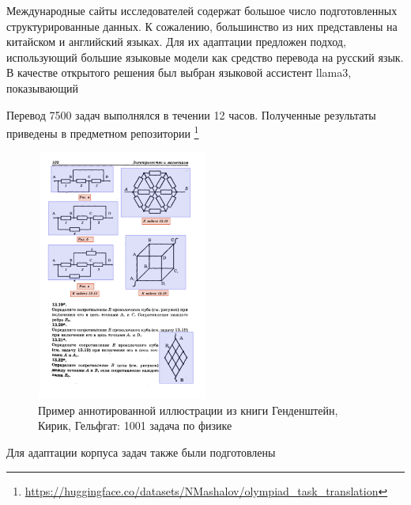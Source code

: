 Международные сайты исследователей содержат
большое число подготовленных структурированные данных. 
К сожалению, большинство из них представлены на китайском и английский языках. Для их адаптации
предложен подход, использующий большие языковые модели как средство перевода на русский язык.
В качестве открытого решения был выбран языковой ассистент llama3, показывающий 


Перевод 7500 задач выполнялся в течении 12 часов.
Полученные результаты приведены в предметном репозитории \footnote{\url{https://huggingface.co/datasets/NMashalov/olympiad_task_translation}}


\begin{figure}[h]
    \centering
    \includegraphics[width=0.5\textwidth]{assets/work/dataset/kirik_labeling.png}
    \caption{Пример аннотированной иллюстрации из книги Генденштейн, Кирик, Гельфгат: 1001 задача по физике}
    \label{annotation}
\end{figure}


Для адаптации корпуса задач также были подготовлены




